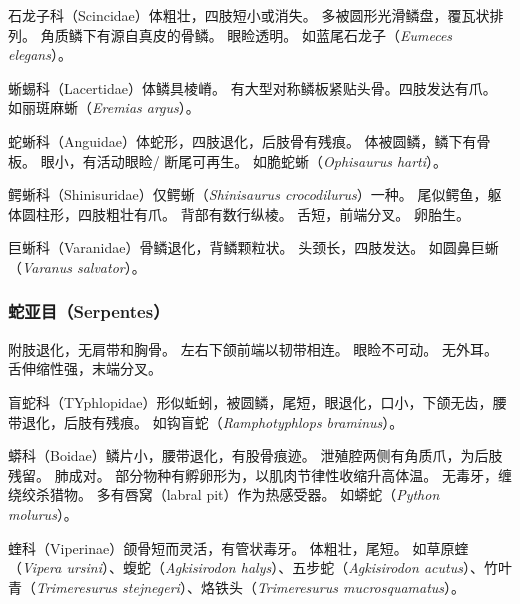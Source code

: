 \documentclass[11pt]{article}
\begin{document}
\newline

石龙子科（Scincidae）体粗壮，四肢短小或消失。
多被圆形光滑鳞盘，覆瓦状排列。
角质鳞下有源自真皮的骨鳞。
眼睑透明。
如蓝尾石龙子（\textit{Eumeces elegans}）。

\newline

蜥蜴科（Lacertidae）体鳞具棱嵴。
有大型对称鳞板紧贴头骨。四肢发达有爪。
如丽斑麻蜥（\textit{Eremias argus}）。

\newline

蛇蜥科（Anguidae）体蛇形，四肢退化，后肢骨有残痕。
体被圆鳞，鳞下有骨板。
眼小，有活动眼睑/
断尾可再生。
如脆蛇蜥（\textit{Ophisaurus harti}）。

\newline

鳄蜥科（Shinisuridae）仅鳄蜥（\textit{Shinisaurus crocodilurus}）一种。
尾似鳄鱼，躯体圆柱形，四肢粗壮有爪。
背部有数行纵棱。
舌短，前端分叉。
卵胎生。

\newline

巨蜥科（Varanidae）骨鳞退化，背鳞颗粒状。
头颈长，四肢发达。
如圆鼻巨蜥（\textit{Varanus salvator}）。

\subsubsection{蛇亚目（Serpentes）}
附肢退化，无肩带和胸骨。
左右下颌前端以韧带相连。
眼睑不可动。
无外耳。
舌伸缩性强，末端分叉。

\newline

盲蛇科（TYphlopidae）形似蚯蚓，被圆鳞，尾短，眼退化，口小，下颌无齿，腰带退化，后肢有残痕。
如钩盲蛇（\textit{Ramphotyphlops braminus}）。

\newline

蟒科（Boidae）鳞片小，腰带退化，有股骨痕迹。
泄殖腔两侧有角质爪，为后肢残留。
肺成对。
部分物种有孵卵形为，以肌肉节律性收缩升高体温。
无毒牙，缠绕绞杀猎物。
多有唇窝（labral pit）作为热感受器。
如蟒蛇（\textit{Python molurus}）。

\newline

蝰科（Viperinae）颌骨短而灵活，有管状毒牙。
体粗壮，尾短。
如草原蝰（\textit{Vipera ursini}）、蝮蛇（\textit{Agkisirodon halys}）、五步蛇（\textit{Agkisirodon acutus}）、竹叶青（\textit{Trimeresurus stejnegeri}）、烙铁头（\textit{Trimeresurus mucrosquamatus}）。
\end{document}

